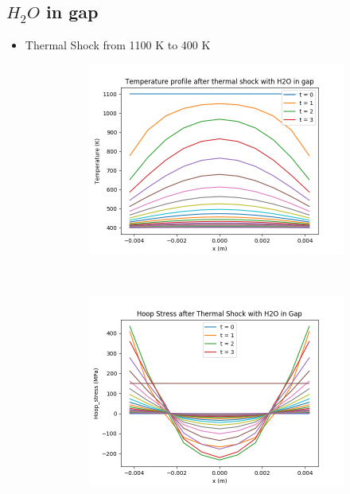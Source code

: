 \documentclass[12pt]{article}
\begin{document}
\subsection{$H_2O$ in gap}
\begin{itemize}
\item Thermal Shock from 1100 K to 400 K

\begin{figure}[h]
    \centering
    \begin{subfigure}[b]{0.4\textwidth}
        \includegraphics[width=\textwidth]{thermalShock_H2O_T_vs_x.png}
        \caption{}
        \label{fig:t125}
    \end{subfigure}
    ~ 
    \begin{subfigure}[b]{0.4\textwidth}
        \includegraphics[width=\textwidth]{thermalShock_H2O_stress_vs_x.png}

\end{subfigure}
\end{figure}
\end{itemize}
\end{document}

